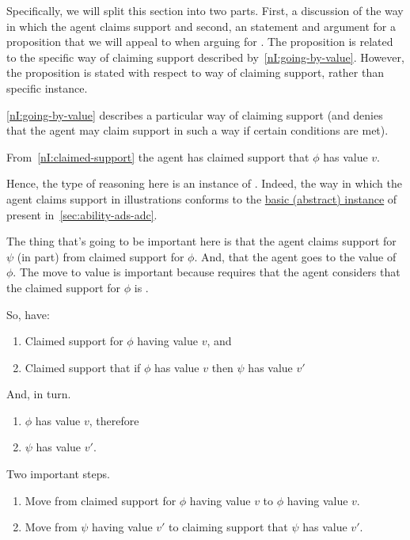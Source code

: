 \begin{note}
  Specifically, we will split this section into two parts.
  First, a discussion of the way in which the agent claims support and second, an statement and argument for a proposition that we will appeal to when arguing for \nI{}.
  The proposition is related to the specific way of claiming support described by~\ref{nI:going-by-value}.
  However, the proposition is stated with respect to way of claiming support, rather than specific instance.
\end{note}

\begin{note}
  \ref{nI:going-by-value} describes a particular way of claiming support (and denies that the agent may claim support in such a way if certain conditions are met).
\end{note}

\begin{note}
  From~\ref{nI:claimed-support} the agent has claimed support that \(\phi\) has value \(v\).

  Hence, the type of reasoning here is an instance of \adA{}.
  Indeed, the way in which the agent claims support in illustrations conforms to the \hyperref[abstract-adA]{basic (abstract) instance} of \adA{} present in~\autoref{sec:ability-ads-adc}.
\end{note}

\begin{note}
  \color{red}
  The thing that's going to be important here is that the agent claims support for \(\psi\) (in part) from claimed support for \(\phi\).
  And, that the agent goes to the value of \(\phi\).
  The move to value is important because requires that the agent considers that the claimed support for \(\phi\) is \nmom{}.
\end{note}

\begin{note}[Breakdown]
  So, have:
  \begin{enumerate}
  \item Claimed support for \(\phi\) having value \(v\), and
  \item Claimed support that if \(\phi\) has value \(v\) then \(\psi\) has value \(v'\)
  \end{enumerate}
  And, in turn.
  \begin{enumerate}
  \item \(\phi\) has value \(v\), therefore
  \item \(\psi\) has value \(v'\).
  \end{enumerate}
  Two important steps.
  \begin{enumerate}
  \item Move from claimed support for \(\phi\) having value \(v\) to \(\phi\) having value \(v\).
  \item Move from \(\psi\) having value \(v'\) to claiming support that \(\psi\) has value \(v'\).
  \end{enumerate}
\end{note}


